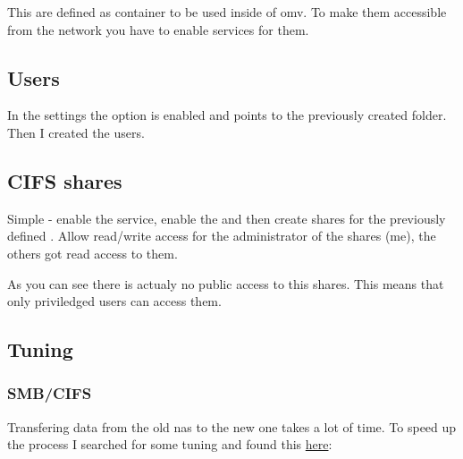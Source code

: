 
This  are defined as container to be used inside
of \gls{omv}. To make them accessible from the network you have to enable
services for them.

\subsection{Users}

In the settings the option  is enabled and
points to the previously created  folder. Then I created
the users.


\subsection{CIFS shares}

Simple - enable the  service, enable the  and then create shares for the previously defined . Allow read/write access for the administrator of the shares (me),
the others got read access to them.



As you can see there is actualy no public access to this shares. This means
that only priviledged users can access them.

\subsection{Tuning}

\subsubsection{SMB/CIFS}

Transfering data from the old \gls{nas} to the new one takes a lot of time. To
speed up the process I searched for some tuning and found this
\href{https://techie-show.com/open-media-vault-smb-performance-quick-win/}{here}:

